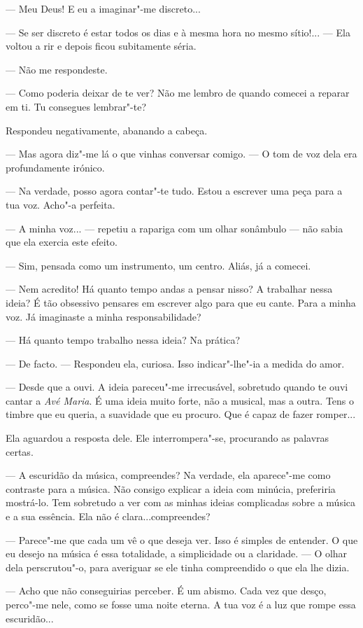 --- Meu Deus! E eu a imaginar"-me discreto...

--- Se ser discreto é estar todos os dias e à mesma hora no mesmo
sítio!... --- Ela voltou a rir e depois ficou subitamente séria.

--- Não me respondeste.

--- Como poderia deixar de te ver? Não me lembro de quando comecei a
reparar em ti. Tu consegues lembrar"-te?

Respondeu negativamente, abanando a cabeça.

--- Mas agora diz"-me lá o que vinhas conversar comigo. --- O tom de voz dela
era profundamente irónico.

--- Na verdade, posso agora contar"-te tudo. Estou a escrever uma peça para
a tua voz. Acho"-a perfeita.

--- A minha voz... --- repetiu a rapariga com um olhar sonâmbulo --- não sabia
que ela exercia este efeito.

--- Sim, pensada como um instrumento, um centro. Aliás, já a comecei.

--- Nem acredito! Há quanto tempo andas a pensar nisso? A trabalhar nessa
ideia? É tão obsessivo pensares em escrever algo para que eu cante. Para
a minha voz. Já imaginaste a minha responsabilidade?

--- Há quanto tempo trabalho nessa ideia? Na prática?

--- De facto. --- Respondeu ela, curiosa. Isso indicar"-lhe"-ia a medida do
amor.

--- Desde que a ouvi. A ideia pareceu"-me irrecusável, sobretudo quando te
ouvi cantar a \emph{Avé Maria}. É uma ideia muito forte, não a musical,
mas a outra. Tens o timbre que eu queria, a suavidade que eu procuro.
Que é capaz de fazer romper...

Ela aguardou a resposta dele. Ele interrompera"-se, procurando as
palavras certas.

--- A escuridão da música, compreendes? Na verdade, ela aparece"-me como
contraste para a música. Não consigo explicar a ideia com minúcia,
preferiria mostrá-lo. Tem sobretudo a ver com as minhas ideias
complicadas sobre a música e a sua essência. Ela não é
clara...compreendes?

--- Parece"-me que cada um vê o que deseja ver. Isso é simples de entender.
O que eu desejo na música é essa totalidade, a simplicidade ou a
claridade. --- O olhar dela perscrutou"-o, para averiguar se ele tinha
compreendido o que ela lhe dizia.

--- Acho que não conseguirias perceber. É um abismo. Cada vez que desço,
perco"-me nele, como se fosse uma noite eterna. A tua voz é a luz que
rompe essa escuridão...

